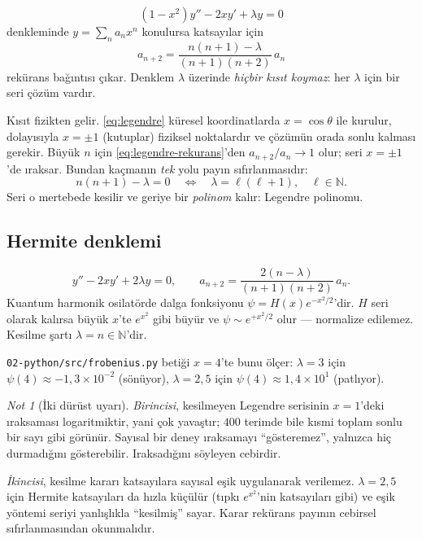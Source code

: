 \documentclass[11pt,a4paper]{article}
\theoremstyle{plain}
\theoremstyle{definition}
\theoremstyle{remark}
\newtheorem*{notkutusu}{Not}
\newcommand{\N}{\mathbb{N}}
\begin{document}
\begin{equation}\label{eq:legendre}
  (1-x^2)y'' - 2xy' + \lambda y = 0
\end{equation}
denkleminde $y = \sum_n a_n x^n$ konulursa katsayılar için
\begin{equation}\label{eq:legendre-rekurans}
  a_{n+2} = \frac{n(n+1) - \lambda}{(n+1)(n+2)}\,a_n
\end{equation}
rekürans bağıntısı çıkar. Denklem $\lambda$ üzerinde \emph{hiçbir kısıt
koymaz}: her $\lambda$ için bir seri çözüm vardır.

Kısıt fizikten gelir. \eqref{eq:legendre} küresel koordinatlarda
$x = \cos\theta$ ile kurulur, dolayısıyla $x = \pm 1$ (kutuplar) fiziksel
noktalardır ve çözümün orada sonlu kalması gerekir. Büyük $n$ için
\eqref{eq:legendre-rekurans}'den $a_{n+2}/a_n \to 1$ olur; seri $x = \pm 1$'de
ıraksar. Bundan kaçmanın \emph{tek} yolu payın sıfırlanmasıdır:
\[
  n(n+1) - \lambda = 0
  \quad\Longleftrightarrow\quad
  \lambda = \ell(\ell+1), \quad \ell \in \N .
\]
Seri o mertebede kesilir ve geriye bir \emph{polinom} kalır: Legendre
polinomu.

\subsection*{Hermite denklemi}

\begin{equation}\label{eq:hermite}
  y'' - 2xy' + 2\lambda y = 0,
  \qquad
  a_{n+2} = \frac{2(n-\lambda)}{(n+1)(n+2)}\,a_n .
\end{equation}
Kuantum harmonik osilatörde dalga fonksiyonu $\psi = H(x)e^{-x^2/2}$'dir. $H$
seri olarak kalırsa büyük $x$'te $e^{x^2}$ gibi büyür ve $\psi \sim e^{+x^2/2}$
olur --- normalize edilemez. Kesilme şartı $\lambda = n \in \N$'dir.

\texttt{02-python/src/frobenius.py} betiği $x=4$'te bunu ölçer: $\lambda = 3$
için $\psi(4) \approx -1{,}3\times 10^{-2}$ (sönüyor), $\lambda = 2{,}5$ için
$\psi(4) \approx 1{,}4\times 10^{1}$ (patlıyor).

\begin{notkutusu}[İki dürüst uyarı]
\emph{Birincisi}, kesilmeyen Legendre serisinin $x=1$'deki ıraksaması
logaritmiktir, yani çok yavaştır; $400$ terimde bile kısmi toplam sonlu bir
sayı gibi görünür. Sayısal bir deney ıraksamayı ``gösteremez'', yalnızca hiç
durmadığını gösterebilir. Iraksadığını söyleyen cebirdir.

\emph{İkincisi}, kesilme kararı katsayılara sayısal eşik uygulanarak
verilemez. $\lambda = 2{,}5$ için Hermite katsayıları da hızla küçülür
(tıpkı $e^{x^2}$'nin katsayıları gibi) ve eşik yöntemi seriyi yanlışlıkla
``kesilmiş'' sayar. Karar rekürans payının cebirsel sıfırlanmasından
okunmalıdır.
\end{notkutusu}
\end{document}
